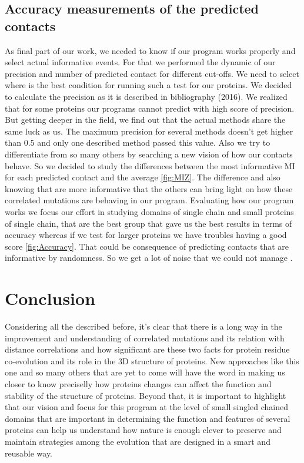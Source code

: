 \documentclass[12pt]{article}
\begin{document}
\subsection{Accuracy measurements of the predicted contacts}
As final part of our work, we needed to know if our program works properly and select actual informative events. For that we performed the dynamic of our precision and number of predicted contact for different cut-offs. We need to select where is the best condition for running such a test for our proteins. We decided to calculate the precision as it is described in bibliography (2016). We realized that for some proteins our programs cannot predict with high score of precision. But getting deeper in the field, we find out that the actual methods share the same luck as us. The maximum precision for several methods doesn't get higher than 0.5 and only one described method passed this value. Also we try to differentiate from so many others by searching a new vision of how our contacts behave. So we decided to study the differences between the most informative MI for each predicted contact and the average \ref{fig:MIZ}. The difference and also knowing that are more informative that the others can bring light on how these correlated mutations are behaving in our program. Evaluating how our program works we focus our effort in studying domains of single chain and small proteins of single chain, that are the best group that gave us the best results in terms of accuracy whereas if we test for larger proteins we have troubles having a good score \ref{fig:Accuracy}. That could be consequence of predicting contacts that are informative by randomness. So we get a lot of noise that we could not manage . \\


\clearpage
 \section{Conclusion}
Considering all the described before, it's clear that there is a long way in the improvement and understanding of correlated mutations and its relation with distance correlations and how significant are these two facts for protein residue co-evolution and its role in the 3D structure of proteins. New approaches like this one and so many others that are yet to come will have the word in making us closer to know preciselly how proteins changes can affect the function and stability of the structure of proteins. Beyond that, it is important to highlight that our vision and focus for this program at the level of small singled chained domains that are important in determining the function and features of several proteins can help us understand how nature is enough clever to preserve and maintain strategies among the evolution that are designed in a smart and reusable way. \\
\end{document}
